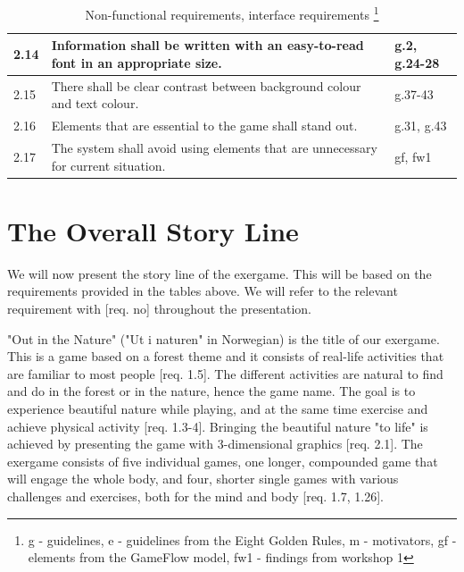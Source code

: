 \begin{minipage}{12 cm}
\begin{table} [H]
\centering
\begin{tabular}{|>{\raggedright}p{}|p{}|p{}|} 
\hline
2.14 & Information shall be written with an easy-to-read font in an appropriate size. &  g.2, g.24-28\\ \hline
2.15 & There shall be clear contrast between background colour and text colour. & g.37-43 \\ \hline
2.16 & Elements that are essential to the game shall stand out. & g.31, g.43\\ \hline
2.17 & The system shall avoid using elements that are unnecessary for current situation.  & gf, fw1\\ \hline
\end{tabular}
\caption[Non-functional requirements, part 2]{Non-functional requirements, interface requirements \footnote{g - guidelines, e - guidelines from the Eight Golden Rules, m - motivators, gf - elements from the GameFlow model, fw1 - findings from workshop 1}}
\label{tab:nonfunc2}
\end{table} 
\end{minipage}

\section{The Overall Story Line}
\label{sec:outinthenature}
We will now present the story line of the exergame. This will be based on the requirements provided in the tables above. We will refer to the relevant requirement with [req. no] throughout the presentation. 

"Out in the Nature" ("Ut i naturen" in Norwegian) is the title of our exergame. This is a game based on a forest theme and it consists of real-life activities that are familiar to most people [req. 1.5]. The different activities are natural to find and do in the forest or in the nature, hence the game name. The goal is to experience beautiful nature while playing, and at the same time exercise and achieve physical activity [req. 1.3-4]. Bringing the beautiful nature "to life" is achieved by presenting the game with 3-dimensional graphics [req. 2.1]. The exergame consists of five individual games, one longer, compounded game that will engage the whole body, and four, shorter single games with various challenges and exercises, both for the mind and body [req. 1.7, 1.26].        

